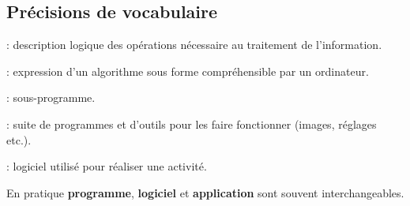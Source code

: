 \subsection{Précisions de vocabulaire}
\begin{slide}
	\small
	\begin{description}
	  \item[Algorithme] : description logique des opérations nécessaire au traitement de l'information.
		\item[Programme] : expression d'un algorithme sous forme compréhensible par un ordinateur.
		\item[Fonction] : sous-programme.
		\item[Logiciel] : suite de programmes et d'outils pour les faire fonctionner (images, réglages etc.).
		\item[Application] : logiciel utilisé pour réaliser une activité. %
		\item En pratique \textbf{programme}, \textbf{logiciel} et \textbf{application} sont souvent interchangeables.
	\end{description}

\end{slide}
